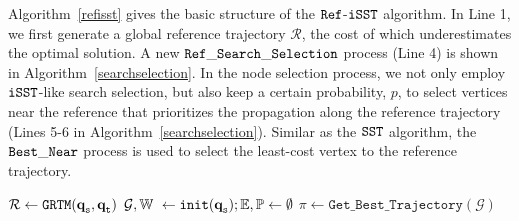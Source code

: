 \documentclass[conference, onecolumn]{IEEEtran}
\begin{document}
Algorithm~\ref{refisst} gives the basic structure of the $\tt Ref$-$\tt iSST$ algorithm. In Line 1, we first generate a global reference trajectory $\mathcal{R}$, the cost of which underestimates the optimal solution. A new {$\tt Ref\_Search\_Selection$} process (Line 4) is shown in Algorithm~\ref{searchselection}. 
In the node selection process, we not only employ $\tt iSST$-like search selection, but also keep a certain probability, $p$, to select vertices near the reference that prioritizes the propagation along the reference trajectory (Lines 5-6 in Algorithm~\ref{searchselection}). Similar as the $\tt SST$ algorithm, the ${\tt Best\_Near}$ process is used to select the least-cost vertex to the reference trajectory.



\begin{algorithm}[ht!]
	\caption {${{\tt Ref}}$-${{\tt iSST}}$}
	\label{refisst}
	\DontPrintSemicolon
	\SetAlgoVlined
	\BlankLine
	$\mathcal{R} \gets \tt{GRTM}(\textbf{q}_{\tt s},\textbf{q}_{\tt t}) $\;
	$\mathcal{G},\mathbb{W}\  \gets \tt{init}(\textbf{q}_{\tt s});\mathbb{E}, \mathbb{P}\gets \emptyset $\;
	$\mathcal{\pi} \gets \mathtt{Get\_Best\_Trajectory}(\mathcal{G})$	
\end{algorithm}
\end{document}
